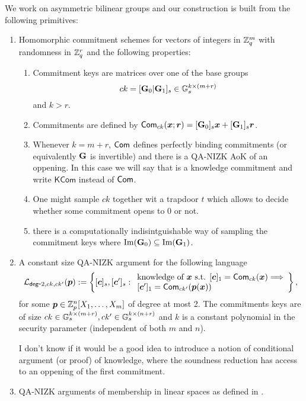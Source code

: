 We work on asymmetric bilinear groups and our construction is built from the following primitives:
\begin{enumerate}
\item Homomorphic commitment schemes for vectors of integers in $\mathbb{Z}_q^m$ with randomness in $\mathbb{Z}_q^r$ and the following properties:
\begin{enumerate}
	\item Commitment keys are matrices over one of the base groups $$ck=[\mathbf{{G}}_0|\mathbf{{G}}_1]_s\in\mathbb{G}_s^{k\times(m+r)}$$ and $k>r$.
	\item Commitments are defined by $\mathsf{Com}_{ck}({\boldsymbol{x}};{\boldsymbol{r}})=[\mathbf{{G}}_0]_s{\boldsymbol{x}}+[\mathbf{{G}}_1]_s{\boldsymbol{r}}$.		\item Whenever $k=m+r$, $\mathsf{Com}$ defines perfectly binding commitments (or equivalently $\mathbf{{G}}$ is invertible) and 	                   there is a QA-NIZK AoK of an oppening. In this case we will say that is a knowledge commitment and write $\mathsf{KCom}$ instead of $\mathsf{Com}$.
\item One might sample $ck$ together wit a trapdoor $t$ which allows to decide whether some commitment opens to $0$ or not.
	\item there is a computationally indisintguishable way of sampling the commitment keys where $\mathrm{Im}(\mathbf{{G}}_0)\subseteq\mathrm{Im}\mathrm(\mathbf{{G}}_1)$.
\end{enumerate}
\item A constant size QA-NIZK argument for the following language
$$
\mathcal{L}_{\mathsf{deg}\mbox{-}2,ck,ck'}({\boldsymbol{p}}):=\left\{[{\boldsymbol{c}}]_s,[{\boldsymbol{c}}']_s:
\begin{array}{l}
		\text{knowledge of } {\boldsymbol{x}} \text{ s.t. }
		{[{\boldsymbol{c}}]_1=\mathsf{Com}_{ck}({\boldsymbol{x}})}
		\Longrightarrow\\
		{[{\boldsymbol{c}}']_1=\mathsf{Com}_{ck'}({\boldsymbol{p}}({\boldsymbol{x}}))}
	\end{array}\right\},
$$
for some ${\boldsymbol{p}}\in\mathbb{Z}_p^n[X_1,\ldots,X_m]$ of degree at most 2. The commitments keys are of size $ck\in\mathbb{G}_s^{k\times(m+r)},ck'\in\mathbb{G}_s^{k\times(n+r)}$ and $k$ is a constant polynomial in the security parameter (independent of both $m$ and $n$).


{\color{red} I don't know if it would be a good idea to introduce a notion of conditional argument (or proof) of knowledge, where the soundness reduction has access to an oppening of the first commitment.}
\item QA-NIZK arguments of membership in linear spaces as defined in \cite{EC:KilWee15}.
\end{enumerate}

